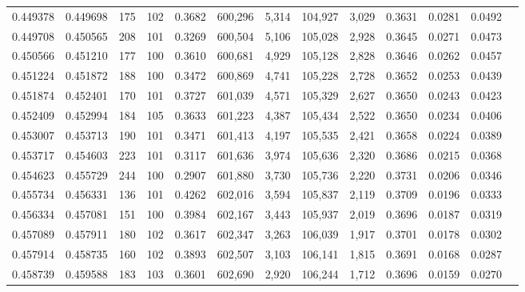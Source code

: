 \begin{tabular}{rrrrrrrrrrrrr}
0.449378 & 0.449698 &   175 & 102 &                                     0.3682 & 600,296 &   5,314 & 104,927 &   3,029 & 0.3631 & 0.0281 & 0.0492 \\
0.449708 & 0.450565 &   208 & 101 &                                     0.3269 & 600,504 &   5,106 & 105,028 &   2,928 & 0.3645 & 0.0271 & 0.0473 \\
0.450566 & 0.451210 &   177 & 100 &                                     0.3610 & 600,681 &   4,929 & 105,128 &   2,828 & 0.3646 & 0.0262 & 0.0457 \\
0.451224 & 0.451872 &   188 & 100 &                                     0.3472 & 600,869 &   4,741 & 105,228 &   2,728 & 0.3652 & 0.0253 & 0.0439 \\
0.451874 & 0.452401 &   170 & 101 &                                     0.3727 & 601,039 &   4,571 & 105,329 &   2,627 & 0.3650 & 0.0243 & 0.0423 \\
0.452409 & 0.452994 &   184 & 105 &                                     0.3633 & 601,223 &   4,387 & 105,434 &   2,522 & 0.3650 & 0.0234 & 0.0406 \\
0.453007 & 0.453713 &   190 & 101 &                                     0.3471 & 601,413 &   4,197 & 105,535 &   2,421 & 0.3658 & 0.0224 & 0.0389 \\
0.453717 & 0.454603 &   223 & 101 &                                     0.3117 & 601,636 &   3,974 & 105,636 &   2,320 & 0.3686 & 0.0215 & 0.0368 \\
0.454623 & 0.455729 &   244 & 100 &                                     0.2907 & 601,880 &   3,730 & 105,736 &   2,220 & 0.3731 & 0.0206 & 0.0346 \\
0.455734 & 0.456331 &   136 & 101 &                                     0.4262 & 602,016 &   3,594 & 105,837 &   2,119 & 0.3709 & 0.0196 & 0.0333 \\
0.456334 & 0.457081 &   151 & 100 &                                     0.3984 & 602,167 &   3,443 & 105,937 &   2,019 & 0.3696 & 0.0187 & 0.0319 \\
0.457089 & 0.457911 &   180 & 102 &                                     0.3617 & 602,347 &   3,263 & 106,039 &   1,917 & 0.3701 & 0.0178 & 0.0302 \\
0.457914 & 0.458735 &   160 & 102 &                                     0.3893 & 602,507 &   3,103 & 106,141 &   1,815 & 0.3691 & 0.0168 & 0.0287 \\
0.458739 & 0.459588 &   183 & 103 &                                     0.3601 & 602,690 &   2,920 & 106,244 &   1,712 & 0.3696 & 0.0159 & 0.0270 \\

\end{tabular}
